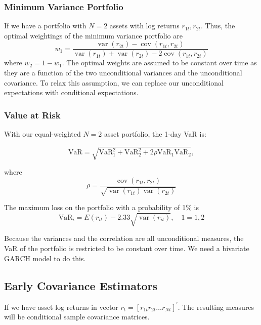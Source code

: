 \documentclass[11pt]{article}
\begin{document}
\subsubsection{Minimum Variance Portfolio}

If we have a portfolio with $N=2$ assets with log returns $r_{1t}, r_{2t}$. Thus, the optimal weightings of the minimum variance portfolio are
\begin{equation}
w_1=\frac{\operatorname{var}\left(r_{2 t}\right)-\operatorname{cov}\left(r_{1 t}, r_{2 t}\right)}{\operatorname{var}\left(r_{1 t}\right)+\operatorname{var}\left(r_{2 t}\right)-2 \operatorname{cov}\left(r_{1 t}, r_{2 t}\right)}
\end{equation}
where $w_2 = 1-w_1$. The optimal weights are assumed to be constant over time as they are a function of the two unconditional variances and the unconditional covariance. To relax this assumption, we can replace our unconditional expectations with conditional expectations.

\subsubsection{Value at Risk}

With our equal-weighted $N=2$ asset portfolio, the 1-day VaR is:

\[\text{VaR} = \sqrt{\text{VaR}_1^2 + \text{VaR}_2^2 + 2 \rho \text{VaR}_1\text{VaR}_2}, \]

where 
\begin{equation}
\rho=\frac{\operatorname{cov}\left(r_{1 t}, r_{2 t}\right)}{\sqrt{\operatorname{var}\left(r_{1 t}\right) \operatorname{var}\left(r_{2 t}\right)}}
\end{equation}

The maximum loss on the portfolio with a probability of 1\% is
\[\text{VaR}_i = E(r_{it}) - 2.33 \sqrt{\operatorname{var}(r_{it})}, \quad 1 = 1,2\]

Because the variances and the correlation are all unconditional measures, the VaR of the portfolio is restricted to be constant over time. We need a bivariate GARCH model to do this.

\subsection{Early Covariance Estimators}
If we have asset log returns in vector $r_t = [r_{1t} r_{2t} \ldots r_{Nt}]^\prime$. The resulting measures will be conditional sample covariance matrices.
\end{document}
